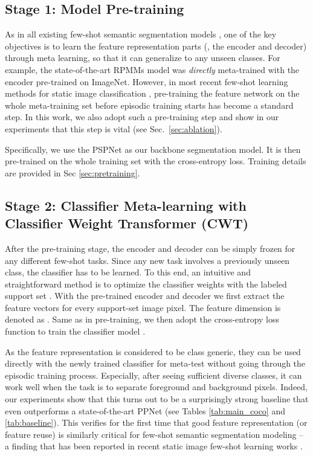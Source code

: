 \documentclass[10pt,twocolumn,letterpaper]{article}
\begin{document}
\subsection{Stage 1: Model Pre-training}

As in all existing few-shot semantic segmentation models \cite{shaban2017one,cao2020few}, one of the key objectives is to learn the feature representation parts (\ie, the encoder and decoder) through meta learning, so that it can generalize to any unseen classes. 
For example, the state-of-the-art RPMMs model \cite{yang2020prototype}
was {\em directly} meta-trained with the encoder pre-trained on ImageNet.
However, in most recent few-shot learning methods for static image classification \cite{ye2020few,zhang2020deepemd}, pre-training the feature network on the whole meta-training set before episodic training starts has become a standard step. In this work, we also adopt such a pre-training step and show in our experiments that this step is vital (see Sec.~\ref{sec:ablation}).


Specifically, we use the PSPNet \cite{zhao2017pyramid} as our backbone segmentation  model. 
It is then pre-trained on the whole training set  with the cross-entropy loss. 
Training details are provided in Sec \ref{sec:pretraining}.





\subsection{Stage 2: Classifier Meta-learning with Classifier Weight Transformer (CWT)}

After the pre-training stage, the encoder and decoder can be simply frozen for any different few-shot tasks.
Since any new task involves a previously unseen class,
the classifier has to be learned.
To this end, an intuitive and straightforward method is to
optimize the classifier weights  with the labeled support set .
With the pre-trained encoder and decoder we first extract the feature vectors  for every support-set image pixel.
The feature dimension is denoted as .
Same as in pre-training, we then adopt the cross-entropy loss function to train the classifier model .

As the feature representation is considered to be class generic,
they can be used directly with the newly trained classifier for meta-test without going through the episodic training process. 
Especially, after seeing sufficient diverse classes, it can work well when the task is to separate foreground and background pixels.
Indeed, our experiments show that this turns out to be a surprisingly strong baseline that even outperforms a state-of-the-art PPNet \cite{liu2020part} (see Tables \ref{tab:main_coco} and \ref{tab:baseline}).
This verifies for the first time that good feature representation (or feature reuse) is similarly critical for few-shot semantic segmentation modeling -- a finding that has been reported in recent static image few-shot learning works  \cite{tian2020rethinking,liu2020negative}.
\end{document}
